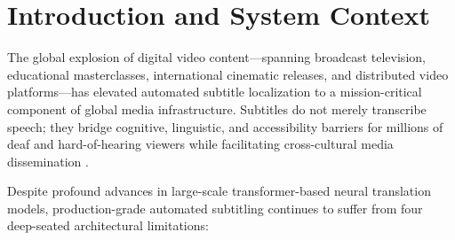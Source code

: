 \documentclass[11pt,a4paper,reqno]{article}
\theoremstyle{definition}
\theoremstyle{remark}
\begin{document}
\newpage
\tableofcontents
\newpage

\section{Introduction and System Context}
\label{sec:intro}

The global explosion of digital video content---spanning broadcast television, educational masterclasses, international cinematic releases, and distributed video platforms---has elevated automated subtitle localization to a mission-critical component of global media infrastructure. Subtitles do not merely transcribe speech; they bridge cognitive, linguistic, and accessibility barriers for millions of deaf and hard-of-hearing viewers while facilitating cross-cultural media dissemination \cite{ebu_tech_3380, netflix_style_guide}.

Despite profound advances in large-scale transformer-based neural translation models, production-grade automated subtitling continues to suffer from four deep-seated architectural limitations:
\end{document}
